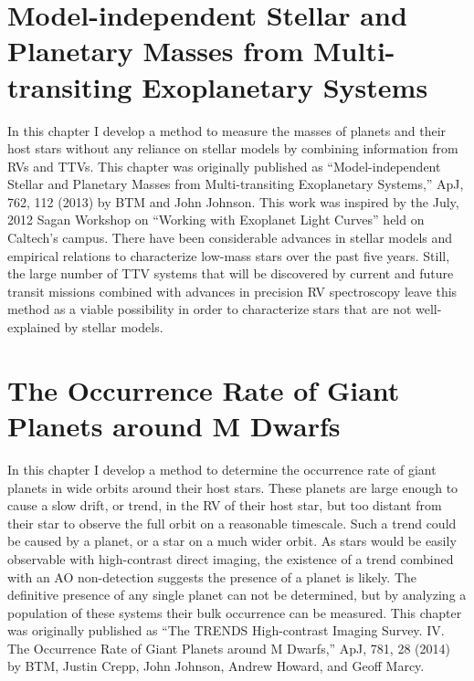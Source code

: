 \documentclass[12pt]{caltech_thesis}
\begin{document}
\chapter{Model-independent Stellar and Planetary Masses from Multi-transiting Exoplanetary Systems}
\label{chap:ttvs}

In this chapter I develop a method to measure the masses of planets and their host stars
without any reliance on stellar models by combining information from RVs and TTVs. 
This chapter was originally published as ``Model-independent Stellar and Planetary Masses from Multi-transiting Exoplanetary Systems,'' ApJ, 762, 112 (2013) by BTM and 
John Johnson. This work was inspired by the July, 2012 Sagan Workshop on ``Working with
Exoplanet Light Curves'' held on Caltech's campus.
There have been considerable advances in stellar models and
empirical relations to characterize low-mass stars over the past five years.
Still,
the large number of TTV systems that will be discovered by current and future transit
missions combined with advances in precision RV spectroscopy leave this method as a viable
possibility in order to characterize stars that are not well-explained by stellar models.

%




\chapter{The Occurrence Rate of Giant Planets around M Dwarfs}
\label{chap:trends}

In this chapter I develop a method to determine the occurrence
rate of giant planets in wide orbits around their host stars.
These planets are large enough to cause a slow drift, or trend, in 
the RV of their host star, but too distant from their star to
observe the full orbit on a reasonable timescale.
Such a trend could be caused by a planet, or a star on a much
wider orbit. As stars would be easily observable with high-contrast
direct imaging, the existence of a trend combined with an AO 
non-detection suggests the presence of a planet is likely.
The definitive presence of any single planet can not be 
determined, but by analyzing a population of these systems their
bulk occurrence can be measured.
This chapter was originally published as ``The TRENDS High-contrast Imaging Survey. IV. The Occurrence Rate of Giant Planets around M Dwarfs,'' ApJ, 781, 28 (2014) by BTM, Justin Crepp, John Johnson,
Andrew Howard, and Geoff Marcy. 
\end{document}
